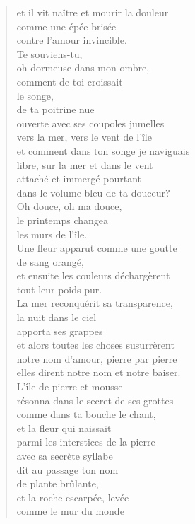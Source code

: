 \documentclass[11pt,a4paper]{book}
\begin{document}
\begin{verse}
et il vit naître et mourir la douleur \\
comme une épée brisée \\
contre l'amour invincible. \\
Te souviens-tu, \\
oh dormeuse dans mon ombre, \\
comment de toi croissait \\
le songe, \\
de ta poitrine nue \\
ouverte avec ses coupoles jumelles \\
vers la mer, vers le vent de l'île \\
et comment dans ton songe je naviguais \\
libre, sur la mer et dans le vent \\
attaché et immergé pourtant \\
dans le volume bleu de ta douceur? \\
Oh douce, oh ma douce, \\
le printemps changea \\
les murs de l'île. \\
Une fleur apparut comme une goutte \\
de sang orangé, \\
et ensuite les couleurs déchargèrent \\
tout leur poids pur. \\
La mer reconquérit sa transparence, \\
la nuit dans le ciel \\
apporta ses grappes \\
et alors toutes les choses susurrèrent \\
notre nom d'amour, pierre par pierre \\
elles dirent notre nom et notre baiser. \\
L'île de pierre et mousse \\
résonna dans le secret de ses grottes \\
comme dans ta bouche le chant, \\
et la fleur qui naissait \\
parmi les interstices de la pierre \\
avec sa secrète syllabe \\
dit au passage ton nom \\
de plante brûlante, \\
et la roche escarpée, levée \\
comme le mur du monde \\

\end{verse}
\end{document}
